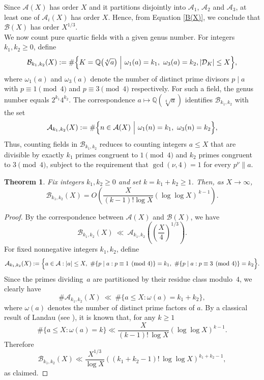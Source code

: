 \documentclass[11pt,reqno]{amsart}
\newcommand{\cA}{\mathcal{A}}
\newcommand{\cB}{\mathcal{B}}
\newcommand{\cD}{\mathcal{D}}
\newtheorem{theorem}{Theorem}[section]
\theoremstyle{definition}
\theoremstyle{remark}
\begin{document}
Since $\cA(X)$ has order $X$ and it partitions disjointly into $\cA_1$, $\cA_2$ and $\cA_3$, at least one of $\cA_i(X)$ has order $X$. Hence, from Equation \eqref{B(X)}, we conclude that $\cB(X)$ has order $X^{1/3}$.\\ 

We now count pure quartic fields with a given genus number. For integers $k_{1},k_{2}\geq 0$, define
\[
\cB_{k_{1},k_{2}}(X)
:=
\#\Bigl\{
K=\mathbb{Q}\bigl(\sqrt[4]{a}\bigr)
\ \Big|\ 
\omega_{1}(a)=k_{1},\ \omega_{3}(a)=k_{2}, |\cD_K|\leq X
\Bigr\},
\]
where $\omega_{1}(a)$ and $\omega_{3}(a)$ denote the number of distinct prime divisors
$p\mid a$ with $p\equiv 1\pmod{4}$ and $p\equiv 3\pmod{4}$ respectively.  
For such a field, the genus number equals $2^{k_{1}}4^{k_{2}}$. The correspondence $a\mapsto \mathbb{Q}(\sqrt[4]{a})$ identifies $\mathcal{B}_{k_{1},k_{2}}$
with the set
\[
\mathcal{A}_{k_{1},k_{2}}(X)
:=
\#\Bigl\{
n\in\mathcal{A}(X)
\ \Big|\
\omega_{1}(n)=k_{1},\ \omega_{3}(n)=k_{2}
\Bigr\},
\] 
Thus, counting fields in $\mathcal{B}_{k_{1},k_{2}}$ reduces to counting integers $a\le X$ that are
divisible by exactly $k_{1}$ primes congruent to $1\pmod{4}$ and $k_{2}$ primes congruent to
$3\pmod{4}$, subject to the requirement that $\gcd(\nu,4)=1$ for every $p^{\nu}\parallel a$.

\begin{theorem}\label{thm:upper_bound_Bk1k2}
Fix integers $k_{1},k_{2}\ge 0$ and set $k=k_{1}+k_{2}\ge 1$.  
Then, as $X\to\infty$,
\[
\mathcal{B}_{k_{1},k_{2}}(X)
= O\!\left(\frac{X}{(k-1)!\log X}(\log\log X)^{\,k-1}\right).
\]
\end{theorem}


\begin{proof}
By the correspondence between $\cA(X)$ and $\cB(X)$, we have
\[
\mathcal{B}_{k_1,k_2}(X)
\ \ll\ 
\mathcal{A}_{k_1,k_2}\!\left( \left(\frac{X}{4}\right)^{1/3} \right).
\]
For fixed nonnegative integers $k_1,k_2$, define
\[
\mathcal{A}_{k_1,k_2}(X)
:= 
\Bigl\{
a \in \mathcal{A} : |a|\le X,\ 
\#\{p\mid a : p\equiv 1 \pmod{4}\} = k_1,\
\#\{p\mid a : p\equiv 3 \pmod{4}\} = k_2
\Bigr\}.
\]
Since the primes dividing~$a$ are partitioned by their residue class modulo~$4$, 
we clearly have
\[
\#\mathcal{A}_{k_1,k_2}(X)
\ \ll\
\#\{a \le X : \omega(a)=k_1+k_2\},
\]
where $\omega(a)$ denotes the number of distinct prime factors of $a$. By a classical result of Landau (see \cite[Chapter II.6]{Ten15book}), it is known that, for any $k\geq 1$
\[
\#\{a \le X : \omega(a)=k\}
\ll \frac{X}{(k-1)!\,\log X} (\log\log X)^{k-1}.
\]
Therefore
\[
\mathcal{B}_{k_1,k_2}(X)
\ll \frac{X^{1/3}}{\log X} ((k_1+k_2-1)!\,\log\log X)^{k_1+k_2-1},
\]
as claimed.
\end{proof}
\end{document}
